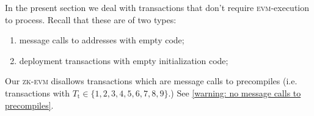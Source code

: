 In the present section we deal with transactions that don't require \textsc{evm}-execution to process. Recall that these are of two types:
\begin{enumerate}
	\item message calls to addresses with empty code;
	\item deployment transactions with empty initialization code;
\end{enumerate}
\saNote{} Our \textsc{zk-evm} disallows transactions which are message calls to precompiles (i.e. transactions with $T_\text{t} \in \{1, 2, 3, 4, 5, 6, 7, 8, 9\}$.) See \ref{warning: no message calls to precompiles}.
